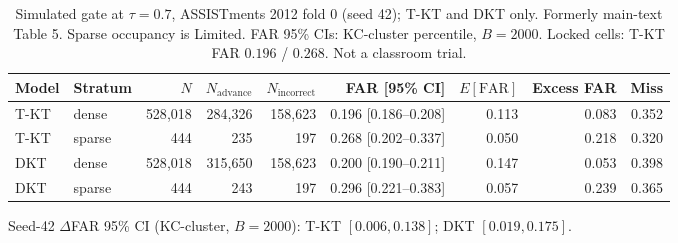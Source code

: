 \begin{table}[htbp]
\caption{Simulated gate at $\tau=0.7$, ASSISTments 2012 fold 0 (seed 42); T-KT and DKT only. Formerly main-text Table 5. Sparse occupancy is Limited. FAR 95\% CIs: KC-cluster percentile, $B=2000$. Locked cells: T-KT FAR $0.196$ / $0.268$. Not a classroom trial.}
\label{tab:s5_seed42_far}
\centering
\small
\begin{tabular}{llrrrrrrr}
\toprule
Model & Stratum & $N$ & $N_{\mathrm{advance}}$ & $N_{\mathrm{incorrect}}$ & FAR [95\% CI] & $E[\mathrm{FAR}]$ & Excess FAR & Miss \\
\midrule
T-KT & dense & 528{,}018 & 284{,}326 & 158{,}623 & 0.196 [0.186--0.208] & 0.113 & 0.083 & 0.352 \\
T-KT & sparse & 444 & 235 & 197 & 0.268 [0.202--0.337] & 0.050 & 0.218 & 0.320 \\
DKT & dense & 528{,}018 & 315{,}650 & 158{,}623 & 0.200 [0.190--0.211] & 0.147 & 0.053 & 0.398 \\
DKT & sparse & 444 & 243 & 197 & 0.296 [0.221--0.383] & 0.057 & 0.239 & 0.365 \\
\bottomrule
\end{tabular}

\vspace{0.4em}
{\footnotesize Seed-42 $\Delta$FAR 95\% CI (KC-cluster, $B=2000$): T-KT $[0.006, 0.138]$; DKT $[0.019, 0.175]$.}
\end{table}
